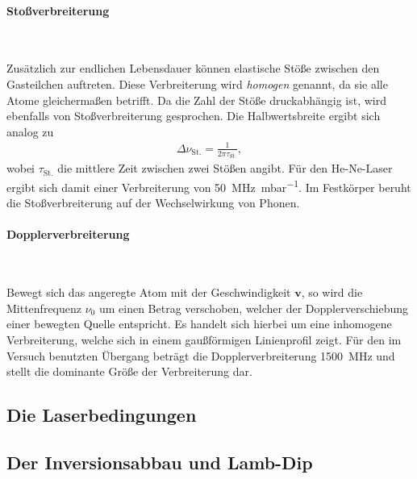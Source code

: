 \documentclass[a4paper,twoside,final]{article}
\begin{document}
\paragraph{Stoßverbreiterung}$~$

Zusätzlich zur endlichen Lebensdauer können elastische Stöße zwischen den Gasteilchen auftreten. Diese Verbreiterung wird \emph{homogen} genannt, da sie alle Atome gleichermaßen betrifft. Da die Zahl der Stöße druckabhängig ist, wird ebenfalls von Stoßverbreiterung gesprochen. Die Halbwertsbreite ergibt sich analog zu
\begin{align}
    \Delta \nu_\text{St.} = \frac{1}{2\pi \tau_\text{St.}},
\end{align}
wobei $\tau_\text{St.}$ die mittlere Zeit zwischen zwei Stößen angibt. Für den He-Ne-Laser ergibt sich damit einer Verbreiterung von \SI{50}{\mega\hertz\per\milli\bar}.
Im Festkörper beruht die Stoßverbreiterung auf der Wechselwirkung von Phonen.

\paragraph{Dopplerverbreiterung}$~$

Bewegt sich das angeregte Atom mit der Geschwindigkeit $\bm{v}$, so wird die Mittenfrequenz $\nu_0$ um einen Betrag verschoben, welcher der Dopplerverschiebung einer bewegten Quelle entspricht. Es handelt sich hierbei um eine inhomogene Verbreiterung, welche sich in einem gaußförmigen Linienprofil zeigt. Für den im Versuch benutzten Übergang beträgt die Dopplerverbreiterung \SI{1500}{\mega\hertz} und stellt die dominante Größe der Verbreiterung dar.

\subsection{Die Laserbedingungen}

\subsection{Der Inversionsabbau und Lamb-Dip}
\end{document}
